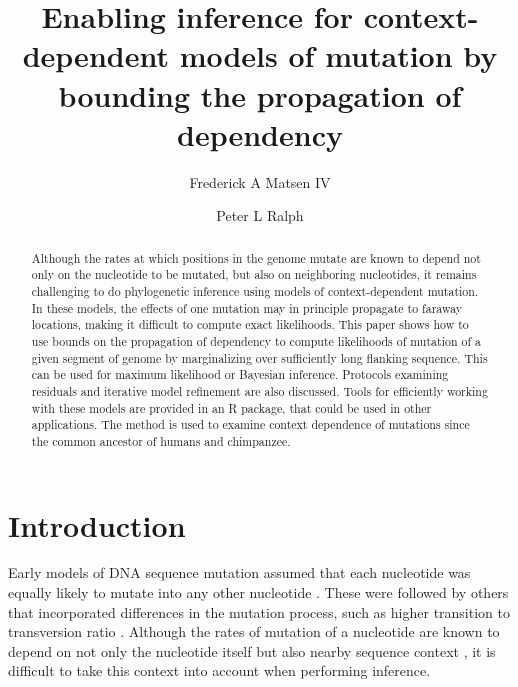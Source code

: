 \documentclass{article}
\theoremstyle{plain}
\theoremstyle{definition}
\begin{document}


\title{Enabling inference for context-dependent models of mutation by bounding the propagation of dependency}
\author[2,3,4,5]{Frederick A Matsen IV}
\author[1,*]{Peter L Ralph}



\maketitle

\begin{abstract}
    Although the rates at which positions in the genome mutate
    are known to depend not only on the nucleotide to be mutated,
    but also on neighboring nucleotides,
    it remains challenging to do phylogenetic inference
    using models of context-dependent mutation.
    In these models,
    the effects of one mutation may in principle propagate
    to faraway locations,
    making it difficult to compute exact likelihoods.
    This paper shows how to use bounds on the propagation of dependency
    to compute likelihoods of mutation of a given segment of genome
    by marginalizing over sufficiently long flanking sequence.
    This can be used for maximum likelihood or Bayesian inference.
    Protocols examining residuals and iterative model refinement
    are also discussed.
    Tools for efficiently working with these models
    are provided in an R package,
    that could be used in other applications.
    The method is used to examine context dependence of mutations
    since the common ancestor of humans and chimpanzee.
\end{abstract}

\section*{Introduction}

Early models of DNA sequence mutation
assumed that each nucleotide was equally likely to mutate
into any other nucleotide \citep{jukes1969evolution}.
These were followed by others that incorporated differences
in the mutation process, such as higher transition to transversion ratio
\citep{hasegawa1985dating,felsenstein1996hidden}.
Although the rates of mutation of a nucleotide
are known to depend on not only the nucleotide itself
but also nearby sequence context \citep{seplyarskiy2021population},
it is difficult to take this context into account when performing inference.
\end{document}
